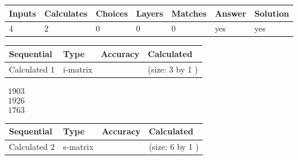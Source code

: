 \documentclass[12pt]{article}
\begin{document}
 
 
\noindent{}
 
 

 
 
 
\noindent{}
 
 

 
 
\noindent{}
 
 

 
\vspace{0.3in}
   
   
   
   
\noindent\begin{tabular}{|l|l|l|l|l|l|l|}
 \hline
Inputs & Calculates & Choices & Layers & Matches & Answer & Solution \\ \hline
 4  & 
 2  & 
 0
  & 
 0  & 
 0  & 
  yes & 
  yes 
  \\ \hline
 \end{tabular}
   
   
   
   
\noindent{}
   
   
  
  
\noindent\begin{tabular}{|l|l|l|l|}
\hline
 Sequential & Type & Accuracy & Calculated \\ 
\hline
 
 
  Calculated $  1 $ & i-matrix &  & 
 (size:  3  by  1 )
 \\  \hline  
 \end{tabular}
   
   
$\begin{array}{
 c
 }
 1903  \\ 
 1926  \\ 
 1763
 \end{array}  $ 
  
  
\noindent\begin{tabular}{|l|l|l|l|}
\hline
 Sequential & Type & Accuracy & Calculated \\ 
\hline
 
 
  Calculated $  2 $ & s-matrix & & 
 (size:  6  by  1 )
 \\  \hline  
 \end{tabular}
   
\end{document}
